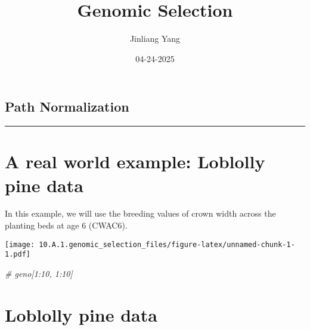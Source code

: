 \documentclass[
]{article}
\title{Genomic Selection}
\author{Jinliang Yang}
\date{04-24-2025}
\newenvironment{Shaded}{\begin{snugshade}}{\end{snugshade}}
\newcommand{\AttributeTok}[1]{\textcolor[rgb]{0.13,0.29,0.53}{#1}}
\newcommand{\CommentTok}[1]{\textcolor[rgb]{0.56,0.35,0.01}{\textit{#1}}}
\newcommand{\ConstantTok}[1]{\textcolor[rgb]{0.56,0.35,0.01}{#1}}
\newcommand{\FunctionTok}[1]{\textcolor[rgb]{0.13,0.29,0.53}{\textbf{#1}}}
\newcommand{\NormalTok}[1]{#1}
\newcommand{\OtherTok}[1]{\textcolor[rgb]{0.56,0.35,0.01}{#1}}
\newcommand{\SpecialCharTok}[1]{\textcolor[rgb]{0.81,0.36,0.00}{\textbf{#1}}}
\newcommand{\StringTok}[1]{\textcolor[rgb]{0.31,0.60,0.02}{#1}}
\begin{document}
\maketitle

\subsection{Path Normalization}\label{path-normalization}

\begin{center}\rule{0.5\linewidth}{0.5pt}\end{center}

\section{A real world example: Loblolly pine
data}\label{a-real-world-example-loblolly-pine-data}

In this example, we will use the breeding values of crown width across
the planting beds at age 6 (CWAC6).

\begin{Shaded}
\end{Shaded}

\texttt{[image: 10.A.1.genomic\_selection\_files/figure-latex/unnamed-chunk-1-1.pdf]}

\begin{Shaded}
\begin{Highlighting}[]
\CommentTok{\# geno[1:10, 1:10]}
\end{Highlighting}
\end{Shaded}

\section{Loblolly pine data}\label{loblolly-pine-data}
\end{document}
